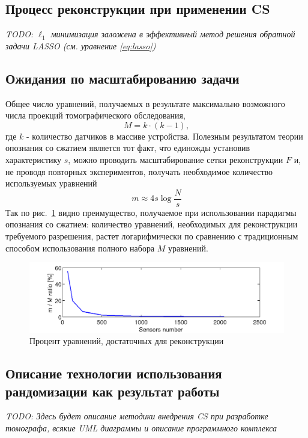 \documentclass[14pt]{matmex-diploma}
\begin{document}
\subsection{Процесс реконструкции при применении CS}
\textit{TODO: $\ell_1$ минимизация заложена в эффективный метод решения обратной задачи LASSO (см. уравнение \eqref{eq:lasso})}\\

\subsection{Ожидания по масштабированию задачи}
Общее число уравнений, получаемых в результате максимально возможного числа проекций томографического обследования, \[M = k\cdot (k-1),\] где $k$ - количество датчиков в массиве устройства. 
Полезным результатом теории опознания со сжатием является тот факт, что единожды установив характеристику $s$, можно проводить масштабирование сетки реконструкции $F$ и, не проводя повторных экспериментов, получать необходимое количество используемых уравнений
\begin{equation}\label{eq:approx_m}
m \approx 4 s  \log{\frac{N}{s}} 
\end{equation}
Так по рис.~\ref{fig:percents} видно преимущество, получаемое при использовании парадигмы опознания со сжатием: количество уравнений, необходимых для реконструкции требуемого разрешения, растет логарифмически по сравнению с традиционным способом использования полного набора $M$ уравнений.

\begin{figure}[h]
\centering
    \includegraphics[width=1\textwidth]{pics/percents.png}
	\caption{Процент уравнений, достаточных для реконструкции}
	\label{fig:percents}
\end{figure}



\subsection{Описание технологии использования рандомизации как результат работы}
\textit{TODO: Здесь будет описание методики внедрения CS при разработке томографа, всякие UML диаграммы и описание программного комплекса} \\
\end{document}
